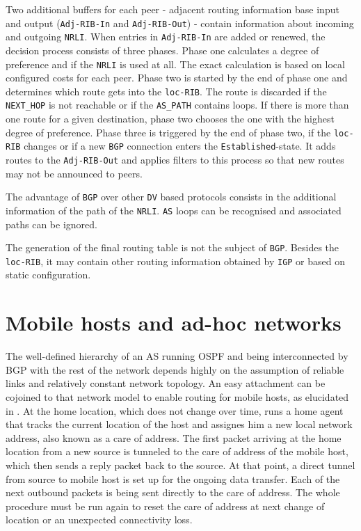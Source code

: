\documentclass{acm_proc_article-sp}
\begin{document}
Two additional buffers for each peer - adjacent routing information base input and output (\texttt{Adj-RIB-In} and \texttt{Adj-RIB-Out}) - contain information about incoming and outgoing \texttt{NRLI}. When entries in \texttt{Adj-RIB-In} are added or renewed, the decision process consists of three phases. Phase one calculates a degree of preference and if the \texttt{NRLI} is used at all. The exact calculation is based on local configured costs for each peer. Phase two is started by the end of phase one and determines which route gets into the \texttt{loc-RIB}. The route is discarded if the \texttt{NEXT\_HOP} is not reachable or if the \texttt{AS\_PATH} contains loops. If there is more than one route for a given destination, phase two chooses the one with the highest degree of preference. Phase three is triggered by the end of phase two, if the \texttt{loc-RIB} changes or if a new \texttt{BGP} connection enters the \texttt{Established}-state. It adds routes to the \texttt{Adj-RIB-Out} and applies filters to this process so that new routes may not be announced to peers.

The advantage of \texttt{BGP} over other \texttt{DV} based protocols consists in the additional information of the path of the \texttt{NRLI}. \texttt{AS} loops can be recognised and associated paths can be ignored.

The generation of the final routing table is not the subject of \texttt{BGP}. Besides the \texttt{loc-RIB}, it may contain other routing information obtained by \texttt{IGP} or based on static configuration.

\section{Mobile hosts and ad-hoc networks}

The well-defined hierarchy of an AS running OSPF and being interconnected by BGP with the rest of the network depends highly on the assumption of reliable links and relatively constant network topology. An easy attachment can be cojoined to that network model to enable routing for mobile hosts, as elucidated in \cite{tanenbaum}. At the home location, which does not change over time, runs a home agent that tracks the current location of the host and assignes him a new local network address, also known as a care of address. The first packet arriving at the home location from a new source is tunneled to the care of address of the mobile host, which then sends a reply packet back to the source. At that point, a direct tunnel from source to mobile host is set up for the ongoing data transfer. Each of the next outbound packets is being sent directly to the care of address. The whole procedure must be run again to reset the care of address at next change of location or an unexpected connectivity loss.  
\end{document}
